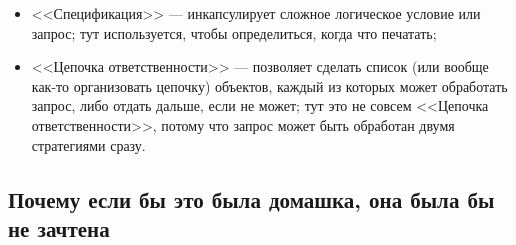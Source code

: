\documentclass{../../text-style}
\begin{document}
\begin{itemize}
\begin{itemize}
        \item <<Спецификация>> --- инкапсулирует сложное логическое условие или запрос; тут используется, чтобы определиться, когда что печатать;
        \item <<Цепочка ответственности>> --- позволяет сделать список (или вообще как-то организовать цепочку) объектов, каждый из которых может обработать запрос, либо отдать дальше, если не может; тут это не совсем <<Цепочка ответственности>>, потому что запрос может быть обработан двумя стратегиями сразу.
    \end{itemize}
\end{itemize}

\subsection{Почему если бы это была домашка, она была бы не зачтена}
\end{document}
